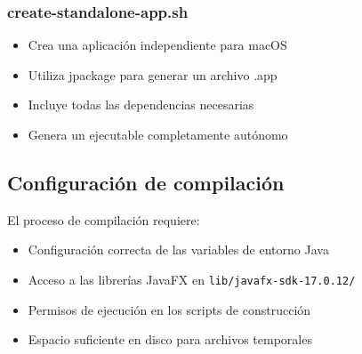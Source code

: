 \subsubsection{create-standalone-app.sh}
\begin{itemize}
    \item Crea una aplicación independiente para macOS
    \item Utiliza jpackage para generar un archivo .app
    \item Incluye todas las dependencias necesarias
    \item Genera un ejecutable completamente autónomo
\end{itemize}

\subsection{Configuración de compilación}

El proceso de compilación requiere:

\begin{itemize}
    \item Configuración correcta de las variables de entorno Java
    \item Acceso a las librerías JavaFX en \texttt{lib/javafx-sdk-17.0.12/}
    \item Permisos de ejecución en los scripts de construcción
    \item Espacio suficiente en disco para archivos temporales
\end{itemize}

